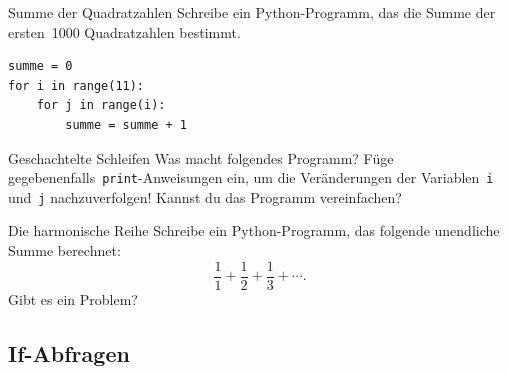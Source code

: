 \documentclass{blatt}
\begin{document}
\begin{aufgabe}{Summe der Quadratzahlen}
Schreibe ein Python-Programm, das die Summe der ersten~1000 Quadratzahlen
bestimmt.
\end{aufgabe}

\begin{lrbox}{\foobox}\begin{minipage}{\textwidth}\begin{verbatim}
summe = 0
for i in range(11):
    for j in range(i):
        summe = summe + 1
\end{verbatim}
\end{minipage}\end{lrbox}
\begin{aufgabe}{Geschachtelte Schleifen}
Was macht folgendes Programm? Füge
gegebenenfalls~\texttt{print}-Anweisungen ein, um die Veränderungen
der Variablen~\texttt{i} und~\texttt{j}
nachzuverfolgen! Kannst du das Programm vereinfachen?

\usebox{\foobox}
\end{aufgabe}

\begin{aufgabe}{Die harmonische Reihe}
Schreibe ein Python-Programm, das folgende unendliche Summe berechnet:
\[ \frac{1}{1} + \frac{1}{2} + \frac{1}{3} + \cdots. \]
Gibt es ein Problem?
\end{aufgabe}


\subsection{If-Abfragen}
\end{document}
